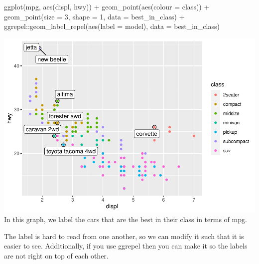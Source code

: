 \documentclass[
]{article}
\newenvironment{Shaded}{\begin{snugshade}}{\end{snugshade}}
\newcommand{\AttributeTok}[1]{\textcolor[rgb]{0.77,0.63,0.00}{#1}}
\newcommand{\DecValTok}[1]{\textcolor[rgb]{0.00,0.00,0.81}{#1}}
\newcommand{\FunctionTok}[1]{\textcolor[rgb]{0.00,0.00,0.00}{#1}}
\newcommand{\NormalTok}[1]{#1}
\newcommand{\SpecialCharTok}[1]{\textcolor[rgb]{0.00,0.00,0.00}{#1}}
\begin{document}
\begin{Shaded}
\begin{Highlighting}[]
\FunctionTok{ggplot}\NormalTok{(mpg, }\FunctionTok{aes}\NormalTok{(displ, hwy)) }\SpecialCharTok{+}
  \FunctionTok{geom\_point}\NormalTok{(}\FunctionTok{aes}\NormalTok{(}\AttributeTok{colour =}\NormalTok{ class)) }\SpecialCharTok{+}
  \FunctionTok{geom\_point}\NormalTok{(}\AttributeTok{size =} \DecValTok{3}\NormalTok{, }\AttributeTok{shape =} \DecValTok{1}\NormalTok{, }\AttributeTok{data =}\NormalTok{ best\_in\_class) }\SpecialCharTok{+}
\NormalTok{  ggrepel}\SpecialCharTok{::}\FunctionTok{geom\_label\_repel}\NormalTok{(}\FunctionTok{aes}\NormalTok{(}\AttributeTok{label =}\NormalTok{ model), }\AttributeTok{data =}\NormalTok{ best\_in\_class)}
\end{Highlighting}
\end{Shaded}

\includegraphics{Journal_files/figure-latex/unnamed-chunk-58-3.pdf} In
this graph, we label the cars that are the best in their class in terms
of mpg.

The label is hard to read from one another, so we can modify it such
that it is easier to see. Additionally, if you use ggrepel then you can
make it so the labels are not right on top of each other.
\end{document}
